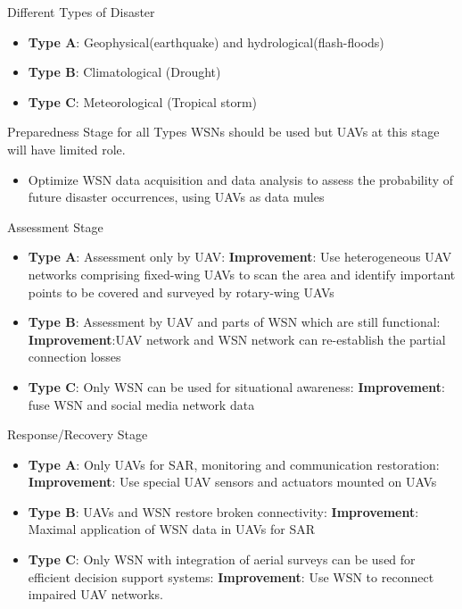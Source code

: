 \documentclass[unknownkeysallowed]{beamer}
\begin{document}
\begin{frame}{Different Types of Disaster}
	\begin{itemize}
		\item \textbf{Type A}: Geophysical(earthquake) and hydrological(flash-floods)
		\item \textbf{Type B}: Climatological (Drought)
		\item \textbf{Type C}: Meteorological (Tropical storm)
	\end{itemize}
\end{frame}

\begin{frame}{Preparedness Stage for all Types}
	WSNs should be used but UAVs at this stage will have limited role. 
	\begin{itemize}
		\item Optimize WSN data acquisition and data analysis to assess the probability of future disaster occurrences, using UAVs as data mules
	\end{itemize}
\end{frame}

\begin{frame}{Assessment Stage}
	\begin{itemize}
		\item \textbf{Type A}: Assessment only by UAV: \textbf{Improvement}: Use heterogeneous UAV networks comprising fixed-wing UAVs to scan
the area and identify important points to be covered and surveyed by rotary-wing UAVs
		\item \textbf{Type B}: Assessment by UAV and parts of WSN which are still functional: \textbf{Improvement}:UAV network and WSN network can re-establish the partial connection losses
		\item \textbf{Type C}: Only WSN can be used for situational awareness: \textbf{Improvement}: fuse WSN and social media network data
	\end{itemize}
\end{frame}

\begin{frame}{Response/Recovery Stage}
	\begin{itemize}
		\item \textbf{Type A}: Only UAVs for SAR, monitoring and communication restoration: \textbf{Improvement}: Use special UAV sensors and actuators mounted on UAVs
		\item \textbf{Type B}: UAVs and WSN restore broken connectivity: \textbf{Improvement}: Maximal application of WSN data in UAVs for SAR
		\item \textbf{Type C}: Only WSN with integration of aerial surveys can be used for efficient decision support systems: \textbf{Improvement}: Use WSN to reconnect impaired UAV networks.
	\end{itemize}
\end{frame}
\end{document}
